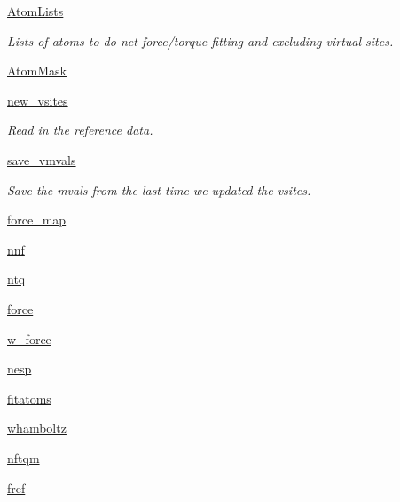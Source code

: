 \begin{DoxyCompactItemize}
\hyperlink{classforcebalance_1_1abinitio_1_1AbInitio_a7e62a74e820ac0c5dd67f49155b95c41}{Atom\-Lists}
\begin{DoxyCompactList}\small\item\em Lists of atoms to do net force/torque fitting and excluding virtual sites. \end{DoxyCompactList}\item 
\hyperlink{classforcebalance_1_1abinitio_1_1AbInitio_a09c8bbc29d2de7dbc471d56cbc574d5d}{Atom\-Mask}
\item 
\hyperlink{classforcebalance_1_1abinitio_1_1AbInitio_a64f1aeadac4d7b09424c20b83e5ad5af}{new\-\_\-vsites}
\begin{DoxyCompactList}\small\item\em Read in the reference data. \end{DoxyCompactList}\item 
\hyperlink{classforcebalance_1_1abinitio_1_1AbInitio_a22037bf43728fa45f387390005e0b131}{save\-\_\-vmvals}
\begin{DoxyCompactList}\small\item\em Save the mvals from the last time we updated the vsites. \end{DoxyCompactList}\item 
\hyperlink{classforcebalance_1_1abinitio_1_1AbInitio_a6558ea4f56053b0f539f987481c57a75}{force\-\_\-map}
\item 
\hyperlink{classforcebalance_1_1abinitio_1_1AbInitio_ac4a5765bf5b089176518f47004fcdb39}{nnf}
\item 
\hyperlink{classforcebalance_1_1abinitio_1_1AbInitio_af8a895f61ddea6b9ca2765ddbf309a75}{ntq}
\item 
\hyperlink{classforcebalance_1_1abinitio_1_1AbInitio_ab483592ce22356d09b52eb594f2f4b8e}{force}
\item 
\hyperlink{classforcebalance_1_1abinitio_1_1AbInitio_a4ec4863edbb6ea4a28777de905d621d3}{w\-\_\-force}
\item 
\hyperlink{classforcebalance_1_1abinitio_1_1AbInitio_ac258ad6180275ba2ffe5f68d1217e4ac}{nesp}
\item 
\hyperlink{classforcebalance_1_1abinitio_1_1AbInitio_a8b12ea0418108cc6c7693d75cc00227f}{fitatoms}
\item 
\hyperlink{classforcebalance_1_1abinitio_1_1AbInitio_a8f70f017ca8ec54c1acdbc85eff06ab9}{whamboltz}
\item 
\hyperlink{classforcebalance_1_1abinitio_1_1AbInitio_a64ae24d7e979723e65358e227b132a4a}{nftqm}
\item 
\hyperlink{classforcebalance_1_1abinitio_1_1AbInitio_ac974dfef45b416947dd21876443d808a}{fref}

\end{DoxyCompactItemize}
